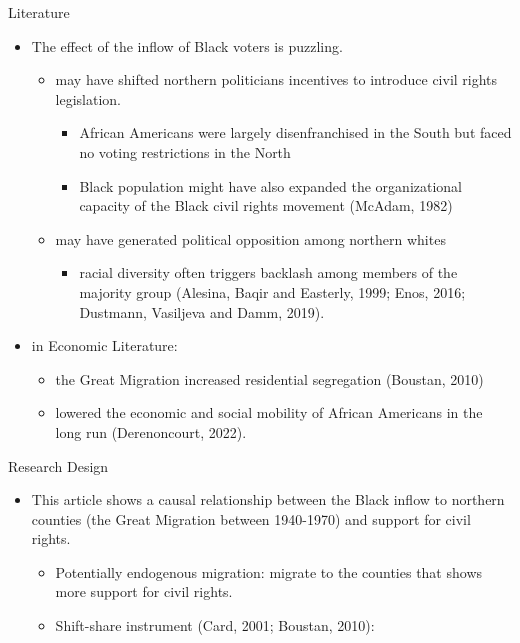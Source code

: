 \documentclass[dvipdfmx,11pt]{beamer}
\begin{document}
\begin{frame}{Literature}
  \begin{itemize}
    \item The effect of the inflow of Black voters is puzzling.
    \begin{itemize}
      \item may have shifted northern politicians incentives to introduce civil rights legislation.
      \begin{itemize}
        \item African Americans were largely disenfranchised in the South but faced no voting restrictions in the North
        \item Black population might have also expanded the organizational capacity of the Black civil rights movement (McAdam, 1982)
      \end{itemize}
      \item may have generated political opposition among northern whites
      \begin{itemize}
        \item racial diversity often triggers backlash among members of the majority group (Alesina, Baqir and Easterly, 1999; Enos, 2016; Dustmann, Vasiljeva and Damm, 2019).
      \end{itemize}
    \end{itemize}
    \item in Economic Literature: 
    \begin{itemize}
      \item the Great Migration increased residential segregation (Boustan, 2010)
      \item lowered the economic and social mobility of African Americans in the long run (Derenoncourt, 2022).
    \end{itemize}
  \end{itemize}
\end{frame}

\begin{frame}{Research Design}
  \begin{itemize}
    \item This article shows a causal relationship between the Black inflow to northern counties (the Great Migration between 1940-1970) and support for civil rights.
    \begin{itemize}
      \item Potentially endogenous migration: migrate to the counties that shows more support for civil rights.
      \item Shift-share instrument (Card, 2001; Boustan, 2010): 
    \end{itemize}
  \end{itemize}
\end{frame}
\end{document}
